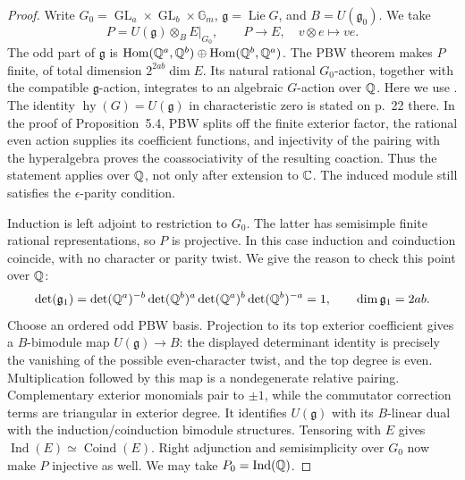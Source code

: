 \begin{proof}
Write $G_0=\operatorname{GL}_a\times\operatorname{GL}_b\times
\mathbb G_m$, $\mathfrak g=\operatorname{Lie}G$, and
$B=U(\mathfrak g_0)$.  We take
\[
 P=U(\mathfrak g)\otimes_B E|_{G_0},\qquad
 P\longrightarrow E,\quad v\otimes e\longmapsto ve.
\]
The odd part of $\mathfrak g$ is
$\operatorname{Hom}(\mathbb Q^a,\mathbb Q^b)\oplus
\operatorname{Hom}(\mathbb Q^b,\mathbb Q^a)$.
The PBW theorem makes $P$ finite, of total dimension
$2^{2ab}\dim E$.  Its natural rational $G_0$-action, together with
the compatible $\mathfrak g$-action, integrates to an algebraic
$G$-action over $\mathbb Q$.  Here we use
\citet[Corollary~3.6, p.~9; Proposition~5.4 and its proof,
pp.~23--24; Theorem~5.8 and Corollary~5.10, p.~26]{c_masuokashibata2017super}.
The identity $\operatorname{hy}(G)=U(\mathfrak g)$ in characteristic
zero is stated on p.~22 there.  In the proof of Proposition~5.4,
PBW splits off the finite exterior factor, the rational even action
supplies its coefficient functions, and injectivity of the pairing
with the hyperalgebra proves the coassociativity of the resulting
coaction.  Thus the statement applies over $\mathbb Q$, not only after
extension to $\mathbb C$.  The induced module still satisfies the
$\epsilon$-parity condition.

Induction is left adjoint to restriction to $G_0$.  The latter has
semisimple finite rational representations, so $P$ is projective.
In this case induction and coinduction coincide, with no character
or parity twist.  We give the reason to check this point over $\mathbb Q$:
\[
 \det(\mathfrak g_1)
 =\det(\mathbb Q^a)^{-b}\det(\mathbb Q^b)^a
  \det(\mathbb Q^a)^b\det(\mathbb Q^b)^{-a}=1,
 \qquad \dim\mathfrak g_1=2ab.
\]
Choose an ordered odd PBW basis.  Projection to its top exterior
coefficient gives a $B$-bimodule map $U(\mathfrak g)\to B$:
the displayed determinant identity is precisely the vanishing of
the possible even-character twist, and the top degree is even.
Multiplication followed by this map is a nondegenerate relative
pairing.  Complementary exterior monomials pair to $\pm1$, while
the commutator correction terms are triangular in exterior degree.
It identifies $U(\mathfrak g)$ with its $B$-linear dual with the
induction/coinduction bimodule structures.  Tensoring with $E$
gives $\operatorname{Ind}(E)\simeq\operatorname{Coind}(E)$.
Right adjunction and semisimplicity over $G_0$ now make $P$
injective as well.  We may take $P_0=\operatorname{Ind}(\mathbb Q)$.


\end{proof}
